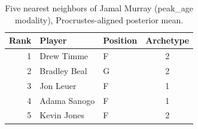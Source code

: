 \begin{table}[htbp]
  \centering\small
  \begin{tabular}{rllc}
    \toprule
    Rank & Player & Position & Archetype \\
    \midrule
    1 & Drew Timme & F & 2 \\
    2 & Bradley Beal & G & 2 \\
    3 & Jon Leuer & F & 1 \\
    4 & Adama Sanogo & F & 1 \\
    5 & Kevin Jones & F & 2 \\
    \bottomrule
  \end{tabular}
  \caption{Five nearest neighbors of Jamal Murray (peak_age modality), Procrustes-aligned posterior mean.}
  \label{tab:Jamal_Murray_neighbors_peak_age}
\end{table}

